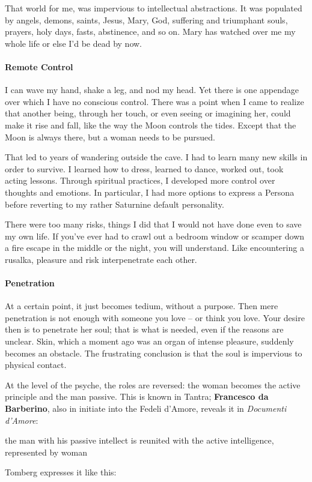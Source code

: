 That world for me, was impervious to intellectual abstractions. It was populated by angels, demons, saints, Jesus, Mary, God, suffering and triumphant souls, prayers, holy days, fasts, abstinence, and so on. Mary has watched over me my whole life or else I'd be dead by now.

\paragraph{Remote Control}
I can wave my hand, shake a leg, and nod my head. Yet there is one appendage over which I have no conscious control. There was a point when I came to realize that another being, through her touch, or even seeing or imagining her, could make it rise and fall, like the way the Moon controls the tides. Except that the Moon is always there, but a woman needs to be pursued.

That led to years of wandering outside the cave. I had to learn many new skills in order to survive. I learned how to dress, learned to dance, worked out, took acting lessons. Through spiritual practices, I developed more control over thoughts and emotions. In particular, I had more options to express a Persona before reverting to my rather Saturnine default personality.

There were too many risks, things I did that I would not have done even to save my own life. If you've ever had to crawl out a bedroom window or scamper down a fire escape in the middle or the night, you will understand. Like encountering a rusalka, pleasure and risk interpenetrate each other.

\paragraph{Penetration}
At a certain point, it just becomes tedium, without a purpose. Then mere penetration is not enough with someone you love – or think you love. Your desire then is to penetrate her soul; that is what is needed, even if the reasons are unclear. Skin, which a moment ago was an organ of intense pleasure, suddenly becomes an obstacle. The frustrating conclusion is that the soul is impervious to physical contact.

At the level of the psyche, the roles are reversed: the woman becomes the active principle and the man passive. This is known in Tantra; \textbf{Francesco da Barberino}, also in initiate into the Fedeli d'Amore, reveals it in \emph{Documenti d'Amore}:

\begin{quotex}
the man with his passive intellect is reunited with the active intelligence, represented by woman 

\end{quotex}
Tomberg expresses it like this:

